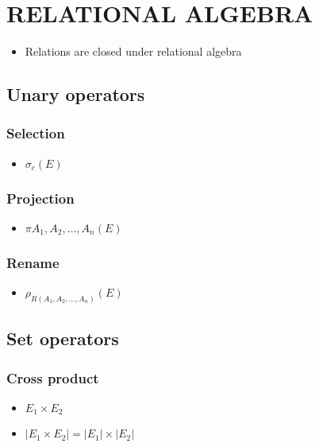 \documentclass[10pt]{article}
\begin{document}
\section{RELATIONAL ALGEBRA}

\begin{itemize}
	\item Relations are closed under relational algebra
\end{itemize}

\subsection{Unary operators}

\subsubsection{Selection}

\begin{itemize}
	\item $\sigma_{c}(E)$
\end{itemize}

\subsubsection{Projection}

\begin{itemize}
	\item $\pi{A_1, A_2, \ldots, A_n}(E)$
\end{itemize}

\subsubsection{Rename}

\begin{itemize}
	\item $\rho_{R(A_1, A_2, \ldots, A_n)}(E)$
\end{itemize}

\subsection{Set operators}

\subsubsection{Cross product}

\begin{itemize}
	\item $E_1 \times E_2$
	\item $|E_1 \times E_2| = |E_1| \times |E_2|$
\end{itemize}
\end{document}
